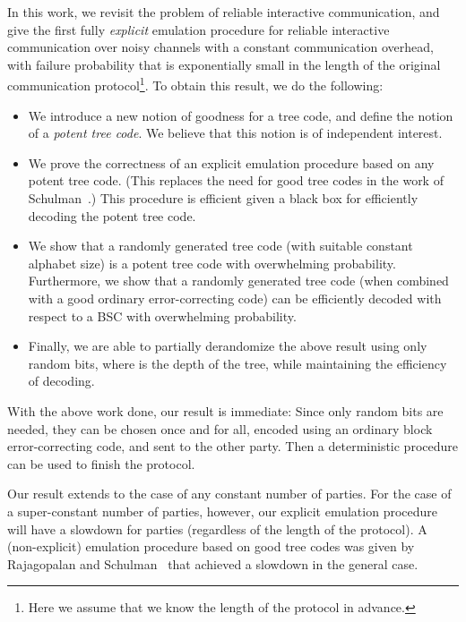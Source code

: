 \documentclass[ letterpaper, 11pt]{article}
\newcommand{\potent}{potent\xspace}
\begin{document}
In this work, we revisit the problem of reliable interactive
communication, and give the first fully \emph{explicit} emulation
procedure for reliable interactive communication over noisy channels
with a constant communication overhead,  with failure probability
that is exponentially small in the length of the original
communication protocol\footnote{Here we assume that we know the
length of the protocol in advance.}.  To obtain this result, we do
the following:

\begin{itemize}\addtolength{\itemsep}{-0.5em}
\item
We introduce a new notion of goodness for a tree code, and define
the notion of a \emph{\potent tree code}.  We believe that this
notion is of independent interest.
\item
We prove the correctness of an explicit emulation procedure based on
any \potent tree code.  (This replaces the need for good tree codes
in the work of Schulman~\cite{schulman93}.)  This procedure is
efficient given a black box for efficiently decoding the \potent
tree code.
\item
We show that a randomly generated tree code (with suitable constant
alphabet size) is a \potent tree code with overwhelming probability.
Furthermore, we show that a randomly generated tree code (when
combined with a good ordinary error-correcting code) can be
efficiently decoded with respect to a BSC with overwhelming
probability.

\item
Finally, we are able to partially derandomize the above result using
only  random bits, where  is the depth of the tree, while
maintaining the efficiency of decoding.
\end{itemize}

With the above work done, our result is immediate: Since only 
random bits are needed, they can be chosen once and for all, encoded
using an ordinary block error-correcting code, and sent to the other
party.  Then a deterministic procedure can be used to finish the
protocol.

Our result extends to the case of any constant number of parties.
For the case of a super-constant number of parties, however, our
explicit emulation procedure will have a  slowdown for 
parties (regardless of the length of the protocol).  A
(non-explicit) emulation procedure based on good tree codes was
given by Rajagopalan and Schulman~\cite{RS94} that achieved a
 slowdown in the general case.
\end{document}
